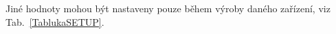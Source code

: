 \begin{table}[!ht]
\centering
\caption{Konfigurace intervalu zasílání pomocí DIP přepínače~\cite{CidloWeptech}}
\label{TablukaDIP}
\end{table}

Jiné hodnoty mohou být nastaveny pouze během výroby daného zařízení, viz Tab.~\ref{TablukaSETUP}.

